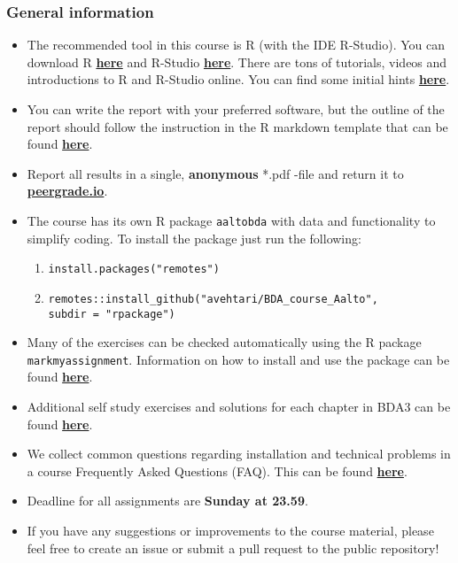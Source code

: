 
\subsubsection*{General information}


\begin{itemize}
\itemsep0em
\item The recommended tool in this course is R (with the IDE R-Studio). You can download R \href{https://cran.r-project.org/}{\textbf{here}} and R-Studio \href{https://www.rstudio.com/products/rstudio/download/}{\textbf{here}}. There are tons of tutorials, videos and introductions to R and R-Studio online. You can find some initial hints \href{https://www.rstudio.com/online-learning/}{\textbf{here}}.
\item  You can write the report with your preferred software, but the outline of the report should follow the instruction in the R markdown template that can be found \href{https://raw.githubusercontent.com/avehtari/BDA_course_Aalto/master/templates/assignment_template.rmd}{\textbf{here}}.
\item  Report all results in a single, {\bf anonymous} *.pdf -file and return it to \href{peergrade.io}{\textbf{peergrade.io}}.
\item The course has its own R package \texttt{aaltobda} with data and functionality to simplify coding. To install the package just run the following:
\begin{enumerate}
\item \texttt{install.packages("remotes")}
\item \texttt{remotes::install\_github("avehtari/BDA\_course\_Aalto", \\ subdir = "rpackage")}
\end{enumerate}
\item Many of the exercises can be checked automatically using the R package \\ \texttt{markmyassignment}. Information on how to install and use the package can be found \href{https://cran.r-project.org/web/packages/markmyassignment/vignettes/markmyassignment.html}{\textbf{here}}.
\item Additional self study exercises and solutions for each chapter in BDA3 can be found \href{http://www.stat.columbia.edu/~gelman/book/solutions3.pdf}{\textbf{here}}.
\item We collect common questions regarding installation and technical problems in a course Frequently Asked Questions (FAQ). This can be found \href{https://github.com/avehtari/BDA_course_Aalto/blob/master/FAQ.md}{\textbf{here}}.
\item Deadline for all assignments are \textbf{Sunday at 23.59}.
\item If you have any suggestions or improvements to the course material, please feel free to create an issue or submit a pull request to the public repository!
\end{itemize}
